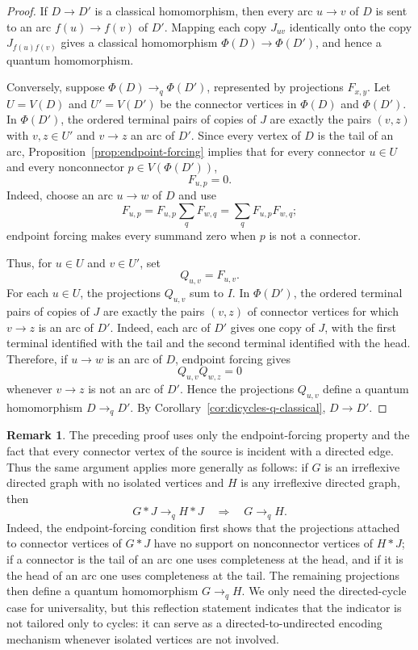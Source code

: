 \documentclass[11pt]{amsart}
\theoremstyle{plain}
\theoremstyle{definition}
\newtheorem{remark}[theorem]{Remark}
\newcommand{\toq}{\to_q}
\newcommand{\Id}{I}
\begin{document}
\begin{proof}
If $D\to D'$ is a classical homomorphism, then every arc $u\to v$ of $D$ is sent to an arc $f(u)\to f(v)$ of $D'$.  Mapping each copy $J_{uv}$ identically onto the copy $J_{f(u)f(v)}$ gives a classical homomorphism $\Phi(D)\to\Phi(D')$, and hence a quantum homomorphism.

Conversely, suppose $\Phi(D)\toq\Phi(D')$, represented by projections $F_{x,y}$.  Let $U=V(D)$ and $U'=V(D')$ be the connector vertices in $\Phi(D)$ and $\Phi(D')$.  In $\Phi(D')$, the ordered terminal pairs of copies of $J$ are exactly the pairs $(v,z)$ with $v,z\in U'$ and $v\to z$ an arc of $D'$.  Since every vertex of $D$ is the tail of an arc, Proposition~\ref{prop:endpoint-forcing} implies that for every connector $u\in U$ and every nonconnector $p\in V(\Phi(D'))$,
\[
   F_{u,p}=0.
\]
Indeed, choose an arc $u\to w$ of $D$ and use
\[
   F_{u,p}=F_{u,p}\sum_qF_{w,q}=\sum_qF_{u,p}F_{w,q};
\]
endpoint forcing makes every summand zero when $p$ is not a connector.

Thus, for $u\in U$ and $v\in U'$, set
\[
   Q_{u,v}=F_{u,v}.
\]
For each $u\in U$, the projections $Q_{u,v}$ sum to $\Id$.  In $\Phi(D')$, the ordered terminal pairs of copies of $J$ are exactly the pairs $(v,z)$ of connector vertices for which $v\to z$ is an arc of $D'$.  Indeed, each arc of $D'$ gives one copy of $J$, with the first terminal identified with the tail and the second terminal identified with the head.  Therefore, if $u\to w$ is an arc of $D$, endpoint forcing gives
\[
   Q_{u,v}Q_{w,z}=0
\]
whenever $v\to z$ is not an arc of $D'$.  Hence the projections $Q_{u,v}$ define a quantum homomorphism $D\toq D'$.  By Corollary~\ref{cor:dicycles-q-classical}, $D\to D'$.
\end{proof}

\begin{remark}\label{rem:general-reflection}
The preceding proof uses only the endpoint-forcing property and the fact that every connector vertex of the source is incident with a directed edge.  Thus the same argument applies more generally as follows: if $G$ is an irreflexive directed graph with no isolated vertices and $H$ is any irreflexive directed graph, then
\[
   G*J\toq H*J
   \quad\Longrightarrow\quad
   G\toq H.
\]
Indeed, the endpoint-forcing condition first shows that the projections attached to connector vertices of $G*J$ have no support on nonconnector vertices of $H*J$; if a connector is the tail of an arc one uses completeness at the head, and if it is the head of an arc one uses completeness at the tail.  The remaining projections then define a quantum homomorphism $G\toq H$.  We only need the directed-cycle case for universality, but this reflection statement indicates that the indicator is not tailored only to cycles: it can serve as a directed-to-undirected encoding mechanism whenever isolated vertices are not involved.
\end{remark}
\end{document}
